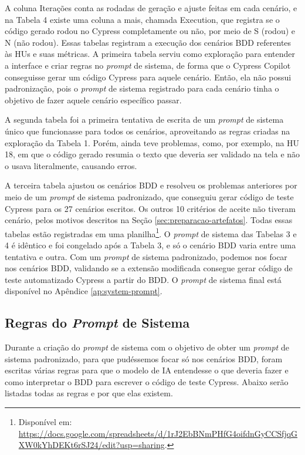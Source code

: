A coluna Iterações conta as rodadas de geração e ajuste feitas em cada cenário, e na Tabela 4 existe uma coluna a mais, chamada Execution, que registra se o código gerado rodou no Cypress completamente ou não, por meio de S (rodou) e N (não rodou). Essas tabelas registram a execução dos cenários BDD referentes às HUs e suas métricas. A primeira tabela serviu como exploração para entender a interface e criar regras no \textit{prompt} de sistema, de forma que o Cypress Copilot conseguisse gerar um código Cypress para aquele cenário. Então, ela não possui padronização, pois o \textit{prompt} de sistema registrado para cada cenário tinha o objetivo de fazer aquele cenário específico passar.

A segunda tabela foi a primeira tentativa de escrita de um \textit{prompt} de sistema único que funcionasse para todos os cenários, aproveitando as regras criadas na exploração da Tabela 1. Porém, ainda teve problemas, como, por exemplo, na HU 18, em que o código gerado resumia o texto que deveria ser validado na tela e não o usava literalmente, causando erros.

A terceira tabela ajustou os cenários BDD e resolveu os problemas anteriores por meio de um \textit{prompt} de sistema padronizado, que conseguiu gerar código de teste Cypress para os 27 cenários escritos. Os outros 10 critérios de aceite não tiveram cenário, pelos motivos descritos na Seção \ref{sec:preparacao-artefatos}. Todas essas tabelas estão registradas em uma planilha\footnote{Disponível em: \url{https://docs.google.com/spreadsheets/d/1rJ2EbBNmPHfG4oifdnGyCCSfjqGXW0kYhDEKt6rSJ24/edit?usp=sharing}.}. O \textit{prompt} de sistema das Tabelas 3 e 4 é idêntico e foi congelado após a Tabela 3, e só o cenário BDD varia entre uma tentativa e outra. Com um \textit{prompt} de sistema padronizado, podemos nos focar nos cenários BDD, validando se a extensão modificada consegue gerar código de teste automatizado Cypress a partir do BDD. O \textit{prompt} de sistema final está disponível no Apêndice \ref{ap:system-prompt}.

\subsection{Regras do \textit{Prompt} de Sistema}
\label{sec:regras-system-prompt}

Durante a criação do \textit{prompt} de sistema com o objetivo de obter um \textit{prompt} de sistema padronizado, para que pudéssemos focar só nos cenários BDD, foram escritas várias regras para que o modelo de IA entendesse o que deveria fazer e como interpretar o BDD para escrever o código de teste Cypress. Abaixo serão listadas todas as regras e por que elas existem.

